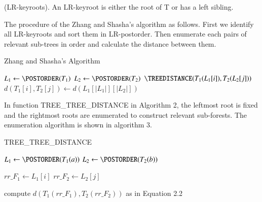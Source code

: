 \begin{definition}
(LR-keyroots). An LR-keyroot is either the root of T or has a left sibling.
\end{definition}

The procedure of the Zhang and Shasha's algorithm as follows. First we identify all LR-keyroots and sort them in LR-postorder. Then enumerate each pairs of relevant sub-trees in order and calculate the distance between them. 

\IncMargin{1em}
\begin{algorithm}
  \caption{Zhang and Shasha's Algorithm}

    $L_1 \gets \POSTORDER(T_1)$\;
    $L_2 \gets \POSTORDER(T_2)$\;
     {
		 {
			$\TREEDISTANCE(T_1(L_1[i]), T_2(L_2[j]))$
		}    
    }
    $d(T_1[i], T_2[j]) \gets d(L_1[\left\vert L_1 \right\vert][\left\vert L_2 \right\vert])$\;
    \;
\end{algorithm}
\DecMargin{1em}

In function TREE\_TREE\_DISTANCE in Algorithm 2, the leftmost root is fixed and the rightmost roots are enumerated to construct relevant sub-forests. The enumeration algorithm is shown in algorithm 3.

\IncMargin{1em}
\begin{algorithm}
  \caption{TREE\_TREE\_DISTANCE}

  \Input{ (\TreeA , \TreeB)}
    $L_1 \gets \POSTORDER(T_1(a))$\;
    $L_2 \gets \POSTORDER(T_2(b))$\;
     {
		 {
			$rr\_F_1 \gets L_1[i]$\;
			$rr\_F_2 \gets L_2[j]$\;
			
			 {
				compute $d(T_1(rr\_F_1),  T_2(rr\_F_2))$ as in Equation 2.2\;
			}
		}    
    }
    \;
\end{algorithm}
\DecMargin{1em} 

